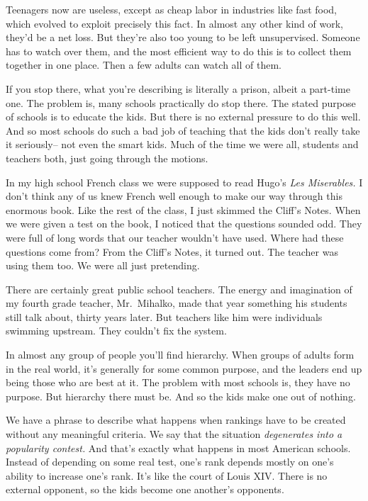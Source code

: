 \documentclass[12pt]{book}
\begin{document}
Teenagers now are useless, except as cheap labor in industries like fast
food, which evolved to exploit precisely this fact. In almost any other
kind of work, they'd be a net loss. But they're also too young to be
left unsupervised. Someone has to watch over them, and the most
efficient way to do this is to collect them together in one place. Then
a few adults can watch all of them.

If you stop there, what you're describing is literally a prison, albeit
a part-time one. The problem is, many schools practically do stop there.
The stated purpose of schools is to educate the kids. But there is no
external pressure to do this well. And so most schools do such a bad job
of teaching that the kids don't really take it seriously-- not even the
smart kids. Much of the time we were all, students and teachers both,
just going through the motions.

In my high school French class we were supposed to read Hugo's \emph{Les
Miserables.} I don't think any of us knew French well enough to make our
way through this enormous book. Like the rest of the class, I just
skimmed the Cliff's Notes. When we were given a test on the book, I
noticed that the questions sounded odd. They were full of long words
that our teacher wouldn't have used. Where had these questions come
from? From the Cliff's Notes, it turned out. The teacher was using them
too. We were all just pretending.

There are certainly great public school teachers. The energy and
imagination of my fourth grade teacher, Mr.~Mihalko, made that year
something his students still talk about, thirty years later. But
teachers like him were individuals swimming upstream. They couldn't fix
the system.

In almost any group of people you'll find hierarchy. When groups of
adults form in the real world, it's generally for some common purpose,
and the leaders end up being those who are best at it. The problem with
most schools is, they have no purpose. But hierarchy there must be. And
so the kids make one out of nothing.

We have a phrase to describe what happens when rankings have to be
created without any meaningful criteria. We say that the situation
\emph{degenerates into a popularity contest.} And that's exactly what
happens in most American schools. Instead of depending on some real
test, one's rank depends mostly on one's ability to increase one's rank.
It's like the court of Louis XIV. There is no external opponent, so the
kids become one another's opponents.
\end{document}
